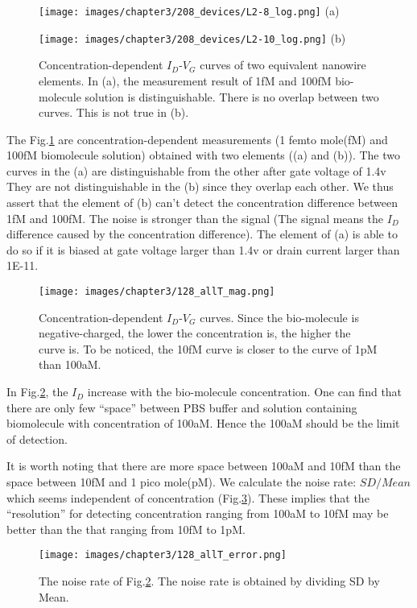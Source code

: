 \begin{figure}[!htbp]
    \centering
    \begin{minipage}[t]{0.4\textwidth}
        \centering
        \texttt{[image: images/chapter3/208\_devices/L2-8\_log.png]}
        (a)
    \end{minipage}
    \hfill
    \begin{minipage}[t]{0.4\textwidth}
        \centering
        \texttt{[image: images/chapter3/208\_devices/L2-10\_log.png]}
        (b)
    \end{minipage}
    \caption{Concentration-dependent $I_D$-$V_G$ curves of two equivalent nanowire elements.
    In (a), the measurement result of 1fM and 100fM bio-molecule solution is distinguishable. There is no overlap between two curves. This is not true in (b).}
    \label{fig:SD_sucandfail}
\end{figure}

The Fig.\ref{fig:SD_sucandfail} are concentration-dependent measurements (1 femto mole(fM) and 100fM biomolecule solution) obtained with two elements ((a) and (b)).
The two curves in the (a) are distinguishable from the other after gate voltage of 1.4v
They are not distinguishable in the (b) since they overlap each other.
We thus assert that the element of (b) can't detect the concentration difference between 1fM and 100fM.
The noise is stronger than the signal (The signal means the $I_D$ difference caused by the concentration difference).
The element of (a) is able to do so if it is biased at gate voltage larger than 1.4v or drain current larger than 1E-11.

\begin{figure}[!htbp]
        \texttt{[image: images/chapter3/128\_allT\_mag.png]}
    \caption{Concentration-dependent $I_D$-$V_G$ curves.
    Since the bio-molecule is negative-charged, the lower the concentration is, the higher the curve is.
    To be noticed, the 10fM curve is closer to the curve of 1pM than 100aM.
     }
    \label{fig:SD_allT}
\end{figure}

In Fig.\ref{fig:SD_allT}, the $I_D$ increase with the bio-molecule concentration.
One can find that there are only few ``space'' between PBS buffer and solution containing biomolecule with concentration of 100aM.
Hence the 100aM should be the limit of detection.

It is worth noting that there are more space between 100aM and 10fM than the space between 10fM and 1 pico mole(pM).
We calculate the noise rate: ${SD} / {Mean}$ which seems independent of concentration (Fig.\ref{fig:SD_allT2}).
{\color{red}These implies that the ``resolution'' for detecting concentration ranging from 100aM to 10fM may be better than the that ranging from 10fM to 1pM.}
\begin{figure}[!htbp]
        \texttt{[image: images/chapter3/128\_allT\_error.png]}
    \caption{The noise rate of Fig.\ref{fig:SD_allT}. The noise rate is obtained by dividing SD by Mean.}
    \label{fig:SD_allT2}
\end{figure}

